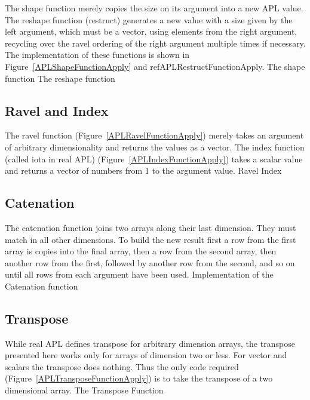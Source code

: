 The {\sf shape} function merely copies the size on its argument into a new APL
value.  The reshape function ({\sf restruct}) generates a new value with a size
given by the left argument, which must be a vector, using elements from the
right argument, recycling over the ravel ordering of the right argument multiple
times if necessary.  The implementation of these functions is shown in
Figure~\ref{APLShapeFunctionApply} and ref{APLRestructFunctionApply}.
%
{The shape function}
%
{The reshape function}

\subsection{Ravel and Index}

The ravel function (Figure~\ref{APLRavelFunctionApply}) merely takes an argument
of arbitrary dimensionality and returns the values as a vector.  The index
function (called iota in real APL) (Figure~\ref{APLIndexFunctionApply}) takes a
scalar value and returns a vector of numbers from 1 to the argument value.
%
{Ravel}
%
{Index}

\subsection{Catenation}

The catenation function joins two arrays along their last dimension.  They must
match in all other dimensions.  To build the new result first a row from the
first array is copies into the final array, then a row from the second array,
then another row from the first, followed by another row from the second, and so
on until all rows from each argument have been used.
%
{Implementation of the Catenation function}

\subsection{Transpose}

While real APL defines transpose for arbitrary dimension arrays, the transpose
presented here works only for arrays of dimension two or less.  For vector and
scalars the transpose does nothing.  Thus the only code required
(Figure~\ref{APLTransposeFunctionApply}) is to take the transpose of a two
dimensional array.
%
{The Transpose Function}

